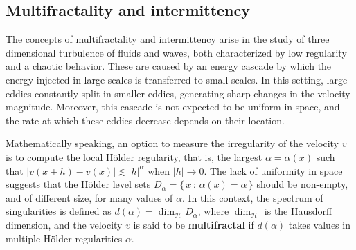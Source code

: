 \documentclass[11pt,reqno]{amsart}
\theoremstyle{definition}
\begin{document}
\subsection{Multifractality and intermittency}
\label{sec:MultifractalityAndIntermittency}

The concepts of multifractality and intermittency arise in 
the study of three dimensional turbulence of fluids and waves, 
both characterized by low regularity and a chaotic behavior. 
These are caused by an energy cascade by which the energy injected in large scales is transferred to small scales. 
In this setting, large eddies constantly split in smaller eddies, 
generating sharp changes in the velocity magnitude. 
Moreover, this cascade is not expected to be uniform in space, 
and the rate at which these eddies decrease depends on their location. 


Mathematically speaking, an option to measure the irregularity of the velocity $v$ is to compute the local H\"older regularity, 
that is, the largest $\alpha = \alpha(x)$ such that $|v(x + h) - v(x)| \lesssim |h|^\alpha$ when $|h| \to 0$. 
The lack of uniformity in space suggests that the H\"older level sets $D_\alpha = \{ \, x \, : \, \alpha(x) = \alpha \,  \}$ should be non-empty, and of different size, for many values of $\alpha$.
In this context, the spectrum of singularities is defined as $d(\alpha) = \operatorname{dim}_{\mathcal H} D_\alpha$, 
where $\operatorname{dim}_{\mathcal H}$ is the Hausdorff dimension,
and the velocity $v$ is said to be \textbf{multifractal} if $d(\alpha)$ takes values in multiple H\"older regularities $\alpha$. 
\end{document}
